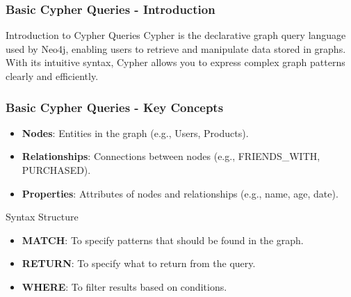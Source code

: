 \documentclass[aspectratio=169]{beamer}
\begin{document}
\begin{frame}[fragile]
    \frametitle{Basic Cypher Queries - Introduction}
    \begin{block}{Introduction to Cypher Queries}
        Cypher is the declarative graph query language used by Neo4j, enabling users to retrieve and manipulate data stored in graphs. 
        With its intuitive syntax, Cypher allows you to express complex graph patterns clearly and efficiently.
    \end{block}
\end{frame}

\begin{frame}[fragile]
    \frametitle{Basic Cypher Queries - Key Concepts}
    \begin{itemize}
        \item \textbf{Nodes}: Entities in the graph (e.g., Users, Products).
        \item \textbf{Relationships}: Connections between nodes (e.g., FRIENDS\_WITH, PURCHASED).
        \item \textbf{Properties}: Attributes of nodes and relationships (e.g., name, age, date).
    \end{itemize}
    
    \begin{block}{Syntax Structure}
        \begin{itemize}
            \item \textbf{MATCH}: To specify patterns that should be found in the graph.
            \item \textbf{RETURN}: To specify what to return from the query.
            \item \textbf{WHERE}: To filter results based on conditions.
        \end{itemize}
    \end{block}
\end{frame}
\end{document}
